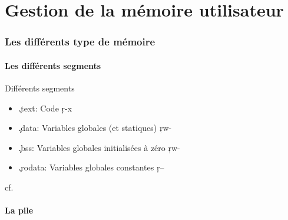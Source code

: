 %
%
%

\part{Gestion de la mémoire utilisateur}

\begin{frame}
  \partpage
\end{frame}

\begin{frame}
  \tableofcontents
\end{frame}

\section{Les différents type de mémoire}

\subsection{Les différents segments}

\begin{frame}[fragile=singleslide]{Différents segments}
  \begin{itemize}
  \item \c{.text}: Code \c{r-x}
  \item \c{.data}: Variables globales (et statiques) \c{rw-}
  \item \c{.bss}: Variables globales initialisées à zéro \c{rw-}
  \item \c{.rodata}: Variables globales constantes \c{r--}
  \end{itemize}
  cf. 
\end{frame}

\subsection{La pile}

